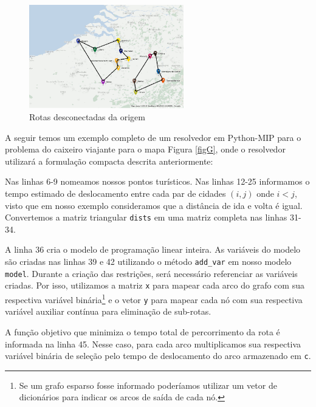 \documentclass[a4paper,11pt,fleqn]{article}
\begin{document}
\begin{figure}
	\begin{centering}
		\includegraphics[width=0.6\textwidth]{belgium-tourism-14-subtour.png}
		\par\end{centering}
	\caption{Rotas desconectadas da origem}
	\label{figSub}
	
\end{figure}

A seguir temos um exemplo completo de um resolvedor em Python-MIP para o problema do caixeiro viajante para o mapa Figura \ref{figG}, onde o resolvedor utilizará a formulação compacta descrita anteriormente:

{\small

}

Nas linhas 6-9 nomeamos nossos pontos turísticos. Nas linhas 12-25 informamos o tempo estimado de deslocamento entre cada par de cidades $(i, j)$ onde $i<j$, visto que em nosso exemplo consideramos que a distância de ida e volta é igual. Convertemos a matriz triangular \texttt{dists} em uma matriz completa nas linhas 31-34.

A linha 36 cria o modelo de programação linear inteira. As variáveis do modelo são criadas nas linhas 39 e 42 utilizando o método \texttt{add\_var} em nosso modelo \texttt{model}. Durante a criação das restrições, será necessário referenciar as variáveis criadas. Por isso, utilizamos a matriz \texttt{x} para mapear cada arco do grafo com sua respectiva variável binária\footnote{Se um grafo esparso fosse informado poderíamos utilizar um vetor de dicionários para indicar os arcos de saída de cada nó.} e o vetor \texttt{y} para mapear cada nó com sua respectiva variável auxiliar contínua para eliminação de sub-rotas.

A função objetivo que minimiza o tempo total de percorrimento da rota é informada na linha 45. Nesse caso, para cada arco multiplicamos sua respectiva variável binária de seleção pelo tempo de deslocamento do arco armazenado em \texttt{c}.
\end{document}
